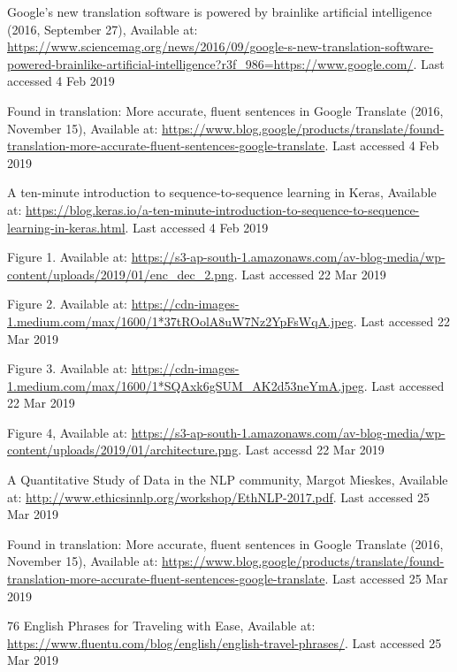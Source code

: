\documentclass[runningheads]{llncs}
\begin{document}
\begin{thebibliography}{8}
	
	
	Google’s new translation software is powered by brainlike artificial intelligence (2016, September 27), Available at:
	\url{https://www.sciencemag.org/news/2016/09/google-s-new-translation-software-powered-brainlike-artificial-intelligence?r3f\_986=https://www.google.com/}.  Last accessed 4 Feb 2019
	
	
	Found in translation: More accurate, fluent sentences in Google Translate (2016, November 15), Available at: \url{https://www.blog.google/products/translate/found-translation-more-accurate-fluent-sentences-google-translate}.  Last accessed 4 Feb 2019

	A ten-minute introduction to sequence-to-sequence learning in Keras, Available at: \url{https://blog.keras.io/a-ten-minute-introduction-to-sequence-to-sequence-learning-in-keras.html}.  Last accessed 4 Feb 2019
	
	Figure 1. Available at: \url{https://s3-ap-south-1.amazonaws.com/av-blog-media/wp-content/uploads/2019/01/enc_dec_2.png}.  Last accessed 22 Mar 2019
	
	Figure 2. Available at: \url{https://cdn-images-1.medium.com/max/1600/1*37tROolA8uW7Nz2YpFsWqA.jpeg}.  Last accessed 22 Mar 2019

	Figure 3. Available at: \url{https://cdn-images-1.medium.com/max/1600/1*SQAxk6gSUM_AK2d53neYmA.jpeg}. Last accessed 22 Mar 2019

	Figure 4, Available at: \url{https://s3-ap-south-1.amazonaws.com/av-blog-media/wp-content/uploads/2019/01/architecture.png}. Last accessd 22 Mar 2019
	
	A Quantitative Study of Data in the NLP community, Margot Mieskes, Available at: \url{http://www.ethicsinnlp.org/workshop/EthNLP-2017.pdf}.  Last accessed 25 Mar 2019

	Found in translation: More accurate, fluent sentences in Google Translate (2016, November 15), Available at: \url{https://www.blog.google/products/translate/found-translation-more-accurate-fluent-sentences-google-translate}.  Last accessed 25 Mar 2019

	76 English Phrases for Traveling with Ease, Available at: \url{https://www.fluentu.com/blog/english/english-travel-phrases/}.  Last accessed 25 Mar 2019


\end{thebibliography}
\end{document}
